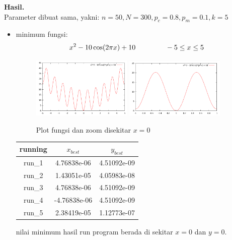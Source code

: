 \documentclass[paper=a4, fontsize=11pt]{scrartcl}
\numberwithin{equation}{section} %
\numberwithin{figure}{section} %
\numberwithin{table}{section} %
\begin{document}
\newpage
\large \textbf{Hasil.}\\
Parameter dibuat sama, yakni: $n = 50, N = 300, p_{c} = 0.8, p_{m} = 0.1, k = 5$
\begin{itemize}
\item minimum fungsi:
\begin{equation*}
x^{2} - 10 \cos(2 \pi x) + 10 \hspace{1.5cm} -5 \leq x \leq 5
\end{equation*}
\begin{figure}
	\centering
	\includegraphics[width=0.45\textwidth]{kurva1.png}
	\includegraphics[width=0.45\textwidth]{kurva1zoom.png}
	\caption{Plot fungsi dan zoom disekitar $x = 0$}
\end{figure}

\begin{table}[ht]
\center
\begin{tabular}{c c c}
\hline
running & $x_{best}$ & $y_{best}$ \\ [0.5ex]
\hline 
run\_1 & 4.76838e-06 & 4.51092e-09 \\
run\_2 & 1.43051e-05 & 4.05983e-08 \\
run\_3 & 4.76838e-06 & 4.51092e-09 \\
run\_4 & -4.76838e-06 & 4.51092e-09 \\
run\_5 & 2.38419e-05 & 1.12773e-07 \\ [1ex]
\hline 
\end{tabular}
\end{table}
nilai minimum hasil run program berada di sekitar $x = 0$ dan $y = 0$.


\end{itemize}
\end{document}
